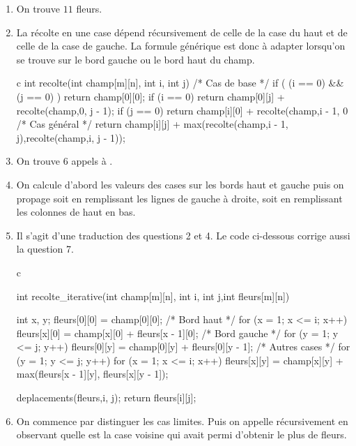 \documentclass[a4paper, 11pt]{article}
\newenvironment{code-env}
{
  \mdfsetup{
    roundcorner=2pt,
    topline=true,
    leftline=true,
    bottomline=true,
    rightline=true,
    innertopmargin=4pt,
    innerbottommargin=4pt,
    innerrightmargin=4pt,
    innerlinewidth=1pt,
    backgroundcolor={gray!10},
    linecolor={gray!40},
    linewidth=0.1pt,
  }
  \begin{mdframed}[]
  }{\end{mdframed}}
\newenvironment{fancy-code}[1]
  {\VerbatimEnvironment
    \begin{code-env}
    \begin{verbatim}}
 {\end{verbatim}\end{code-env}}
\begin{document}
  \begin{enumerate}
    \item On trouve $11$ fleurs.
    \item La récolte en une case dépend récursivement de celle de la case du haut et de celle de la case de gauche. La formule générique est donc à adapter lorsqu'on se trouve sur le bord gauche ou le bord haut du champ.
    \medskip
    \begin{fancy-code}{c}
int recolte(int champ[m][n], int i, int j){
  /* Cas de base */
  if ( (i == 0) && (j == 0) )
   return champ[0][0];
  if (i == 0)
    return champ[0][j] + recolte(champ,0, j - 1);
  if (j == 0)
    return champ[i][0] + recolte(champ,i - 1, 0
  /* Cas général */
  return champ[i][j] + max(recolte(champ,i - 1, j),recolte(champ,i, j - 1));
}
    \end{fancy-code}
    \item On trouve $6$ appels à .
    \item On calcule d'abord les valeurs des cases sur les bords haut et gauche puis on propage soit en remplissant les lignes de gauche à droite, soit en remplissant les colonnes de haut en bas.
    
    \item Il s'agit d'une traduction des questions 2 et 4. Le code ci-dessous corrige aussi la question 7.
    \medskip

    \begin{fancy-code}{c}

int recolte_iterative(int champ[m][n], int i, int j,int fleurs[m][n]){
  int x, y;
  fleurs[0][0] = champ[0][0];
  /* Bord haut */
  for (x = 1; x <= i; x++) {
    fleurs[x][0] = champ[x][0] + fleurs[x - 1][0];
  }
  /* Bord gauche */
  for (y = 1; y <= j; y++) {
    fleurs[0][y] = champ[0][y] + fleurs[0][y - 1];
  }
  /* Autres cases */
  for (y = 1; y <= j; y++) {
    for (x = 1; x <= i; x++) {
      fleurs[x][y] = champ[x][y] + max(fleurs[x - 1][y], fleurs[x][y - 1]);
    } 
  }

  deplacements(fleurs,i, j);
  return fleurs[i][j];
}

    \end{fancy-code}
    \item On commence par distinguer les cas limites. Puis on appelle récursivement  en observant quelle est la case voisine qui avait permi d'obtenir le plus de fleurs.
    \medskip


\end{enumerate}
\end{document}

